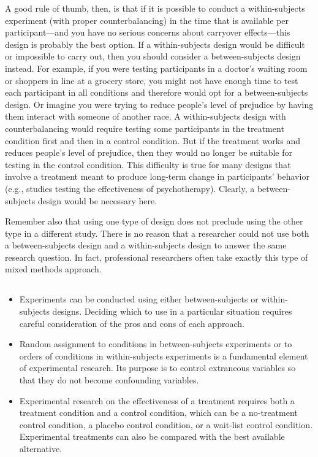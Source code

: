 A good rule of thumb, then, is that if it is possible to conduct a within-subjects experiment (with proper counterbalancing) in the time that is available per participant---and you have no serious concerns about carryover effects---this design is probably the best option. If a within-subjects design would be difficult or impossible to carry out, then you should consider a between-subjects design instead. For example, if you were testing participants in a doctor's waiting room or shoppers in line at a grocery store, you might not have enough time to test each participant in all conditions and therefore would opt for a between-subjects design. Or imagine you were trying to reduce people's level of prejudice by having them interact with someone of another race. A within-subjects design with counterbalancing would require testing some participants in the treatment condition first and then in a control condition. But if the treatment works and reduces people's level of prejudice, then they would no longer be suitable for testing in the control condition. This difficulty is true for many designs that involve a treatment meant to produce long-term change in participants' behavior (e.g., studies testing the effectiveness of psychotherapy). Clearly, a between-subjects design would be necessary here.

Remember also that using one type of design does not preclude using the other type in a different study. There is no reason that a researcher could not use both a between-subjects design and a within-subjects design to answer the same research question. In fact, professional researchers often take exactly this type of mixed methods approach.

\subsection{}
\begin{fullwidth}
\begin{itemize}

\item Experiments can be conducted using either between-subjects or within-subjects designs. Deciding which to use in a particular situation requires careful consideration of the pros and cons of each approach.
\item Random assignment to conditions in between-subjects experiments or to orders of conditions in within-subjects experiments is a fundamental element of experimental research. Its purpose is to control extraneous variables so that they do not become confounding variables.
\item Experimental research on the effectiveness of a treatment requires both a treatment condition and a control condition, which can be a no-treatment control condition, a placebo control condition, or a wait-list control condition. Experimental treatments can also be compared with the best available alternative.

\end{itemize}
\end{fullwidth}


